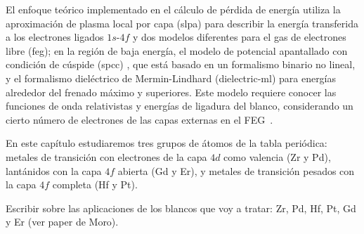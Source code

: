 El enfoque teórico implementado en el cálculo de pérdida de energía 
utiliza la aproximación de plasma local por capa (\acs{slpa}) 
\cite{Montanari:13} para describir la energía transferida a los 
electrones ligados $1s$-$4f$ y dos modelos diferentes para el gas de 
electrones libre (\acs{feg}); en la región de baja energía, el modelo 
de potencial apantallado con condición de cúspide (\acs{spcc}) 
\cite{Montanari:17}, que está basado en un formalismo binario no lineal, 
y el formalismo dieléctrico de Mermin-Lindhard (\acs{dielectric-ml}) 
\cite{Mermin:70} para energías alrededor del frenado máximo y 
superiores. Este modelo requiere conocer las funciones de onda 
relativistas y energías de ligadura del blanco, considerando un cierto 
número de electrones de las capas externas en el FEG~\cite{Mendez:19}. 

En este capítulo estudiaremos tres grupos de átomos de la tabla 
periódica: metales de transición con electrones de la capa $4d$ como 
valencia (Zr y Pd), lantánidos con la capa $4f$ abierta (Gd y Er), 
y metales de transición pesados con la capa $4f$ completa (Hf y Pt). 

{\color{red} Escribir sobre las aplicaciones de los blancos que voy a 
tratar: Zr, Pd, Hf, Pt, Gd y Er  (ver paper de Moro).}


